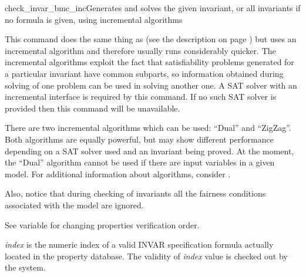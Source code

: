 \begin{nusmvCommand}{check\_invar\_bmc\_inc}{Generates and solves the given 
invariant, or all invariants if no formula is given, using incremental algorithms}
 
\cmdLine{check\_invar\_bmc\_inc [-h ] | [ -n idx | -p "formula" [IN
      context] | -P "name" ]] [-a algorithm]}

This command does the same thing as  (see the
description on page \pageref{checkInvarBmcCommand}) but uses an
incremental algorithm and therefore usually runs considerably
quicker. The incremental algorithms exploit the fact that
satisfiability problems generated for a particular invariant have
common subparts, so information obtained during solving of one problem
can be used in solving another one. A SAT solver with an incremental
interface is required by this command. If no such SAT solver is
provided then this command will be unavailable.

There are two incremental algorithms which can be used: ``Dual'' and
``ZigZag''. Both algorithms are equally powerful, but may show
different performance depending on a SAT solver used and an invariant
being proved.  At the moment, the ``Dual'' algorithm cannot be used if
there are input variables in a given model. For additional information
about algorithms, consider \cite{een04temporal}.

Also, notice that during checking of invariants all the fairness
conditions associated with the model are ignored.

See variable  for changing properties
verification order.

\begin{cmdOpt}

 { {\it index} is the numeric index of a valid
INVAR specification formula actually located in the property
database.  The validity of {\it index} value is checked out by the
system.}
       

            


\end{cmdOpt}

\end{nusmvCommand}
